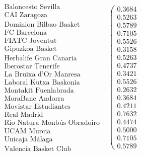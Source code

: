 \begin{ejem}
	\[
	\begin{array}{ccc}
	\begin{array}{c}
	\text{Baloncesto Sevilla}\\
	\text{CAI Zaragoza} \\
	\text{Dominion Bilbao Basket} \\
	\text{FC Barcelona} \\
	\text{FIATC Joventut} \\
	\text{Gipuzkoa Basket} \\
	\text{Herbalife Gran Canaria} \\
	\text{Iberostar Tenerife} \\
	\text{La Bruixa d'Or Manresa} \\
	\text{Laboral Kutxa Baskonia} \\
	\text{Montakit Fuenlabrada} \\
	\text{MoraBanc Andorra} \\
	\text{Movistar Estudiantes} \\
	\text{Real Madrid} \\
	\text{Río Natura Monbús Obradoiro} \\
	\text{UCAM Murcia} \\
	\text{Unicaja Málaga} \\
	\text{Valencia Basket Club}
	\end{array} & \left(\begin{array}{c}
    0.3684\\
    0.5263\\
    0.5789\\
    0.7105\\
    0.5526\\
    0.3158\\
    0.5263\\
    0.4737\\
    0.3421\\
    0.5526\\
    0.2632\\
    0.3684\\
    0.4211\\
    0.7632\\
    0.4474\\
    0.5000\\
    0.7105\\
    0.5789


\end{array}
\end{array}\]
\end{ejem}
